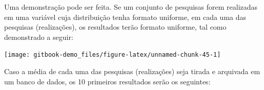 \documentclass[
]{book}
\newenvironment{Shaded}{\begin{snugshade}}{\end{snugshade}}
\newcommand{\KeywordTok}[1]{\textcolor[rgb]{0.13,0.29,0.53}{\textbf{#1}}}
\newcommand{\NormalTok}[1]{#1}
\newcommand{\OperatorTok}[1]{\textcolor[rgb]{0.81,0.36,0.00}{\textbf{#1}}}
\newcommand{\StringTok}[1]{\textcolor[rgb]{0.31,0.60,0.02}{#1}}
\begin{document}
Uma demonstração pode ser feita. Se um conjunto de pesquisas forem
realizadas em uma variável cuja distribuição tenha formato uniforme, em
cada uma das pesquisas (realizações), os resultados terão formato
uniforme, tal como demonstrado a seguir:

\begin{center}\texttt{[image: gitbook-demo\_files/figure-latex/unnamed-chunk-45-1]} \end{center}

Caso a média de cada uma das pesquisas (realizações) seja tirada e
arquivada em um banco de dados, os 10 primeiros resultados serão os
seguintes:

\begin{Shaded}
\end{Shaded}
\end{document}
